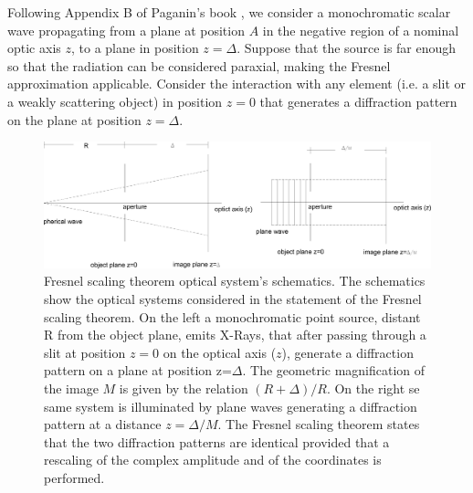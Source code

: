 \documentclass{iucr}              %
\begin{document}
Following Appendix B of Paganin's book \cite{paganin_book}, we consider a monochromatic scalar wave propagating from a plane at position $A$ in the negative region of a nominal optic axis $z$, to a plane in position $z=\Delta$. Suppose that the source is far enough so that the radiation can be considered paraxial, making the Fresnel approximation applicable. Consider the interaction with any element (i.e. a slit or a weakly scattering object) in position $z=0$ that generates a diffraction pattern on the plane at position $z=\Delta$. 

\vspace{0.5 cm}
\begin{figure}
\caption{Fresnel scaling theorem optical system's schematics. The schematics show the optical systems considered in the statement of the Fresnel scaling theorem. On the left a monochromatic point source, distant R from the object plane, emits X-Rays, that after passing through a slit at position $z=0$ on the optical axis ($z$), generate a diffraction pattern on a plane at position z=$\Delta$. The geometric magnification of the image $M$ is given by the relation $(R+\Delta)/R$. On the right se same system is illuminated by plane waves generating a diffraction pattern at a distance $z=\Delta/M$. The Fresnel scaling theorem states that the two diffraction patterns are identical provided that a rescaling of the complex amplitude and of the coordinates is performed.} 
\centering
\includegraphics[width=1\textwidth]{./grafico_gio_paga.png}

\end{figure}
\end{document}
